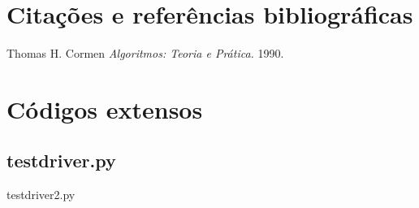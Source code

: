 \documentclass[12pt,a4paper,twoside]{report}
\begin{document}
\chapter{Citações e referências bibliográficas}
	\begin{thebibliography}{1}
		
		 Thomas H. Cormen {\em 
			Algoritmos: Teoria e Prática.
		}  1990.
		
	\end{thebibliography}







\clearpage
{}
\appendix

\chapter{Códigos extensos \label{ap:testdriver}}
\section{testdriver.py}
 {testdriver2.py}
\end{document}
